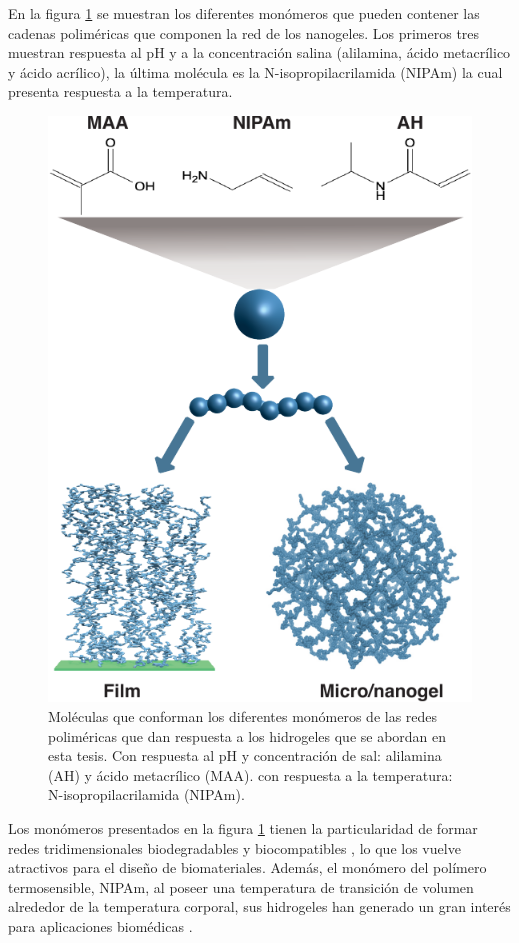 En la figura \ref{fig:intro:acidos-aa-maa} se muestran los diferentes mon\'omeros que pueden contener las cadenas polim\'ericas que componen la red de los nanogeles. Los primeros tres muestran respuesta al pH y a la concentraci\'on salina (alilamina, \'acido metacr\'ilico y \'acido acr\'ilico), la \'ultima mol\'ecula es la N-isopropilacrilamida (NIPAm) la cual presenta respuesta a la temperatura.


\begin{figure}[!tb]
	\centering
	\includegraphics[width=0.75\linewidth]{Figures/modelos/hidrogeles.pdf}
	\caption{Mol\'eculas  que conforman los diferentes mon\'omeros de las redes polim\'ericas que dan respuesta a los hidrogeles que se abordan en esta tesis. Con respuesta al pH y concentraci\'on de sal: alilamina (AH) y  \'acido metacr\'ilico (MAA). con respuesta a la temperatura: N-isopropilacrilamida (NIPAm).}
	\label{fig:intro:acidos-aa-maa}
\end{figure}

Los mon\'omeros presentados en la figura \ref{fig:intro:acidos-aa-maa} tienen la particularidad de formar redes tridimensionales biodegradables y biocompatibles \addcite, lo que los vuelve atractivos para el dise\~no de biomateriales.
Adem\'as, el mon\'omero del pol\'imero termosensible, NIPAm, al poseer una temperatura de transici\'on de volumen alrededor de la temperatura corporal, sus hidrogeles han generado un gran inter\'es para aplicaciones biom\'edicas \cite{Guan2011}.

